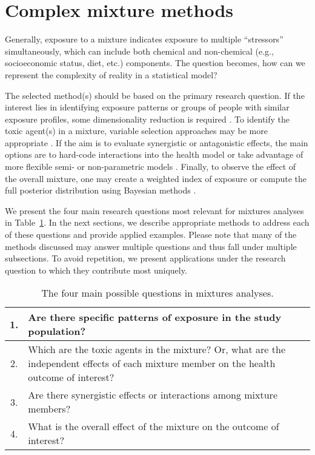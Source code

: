 \section{Complex mixture methods}\label{sec:Methods}

Generally, exposure to a mixture indicates exposure to multiple ``stressors'' simultaneously, which can include both chemical and non-chemical (e.g., socioeconomic status, diet, etc.) components. The question becomes, how can we represent the complexity of reality in a statistical model? 

The selected method(s) should be based on the primary research question. If the interest lies in identifying exposure patterns or groups of people with similar exposure profiles, some dimensionality reduction is required \citep{jolliffe02, thompson04, paatero94}. To identify the toxic agent(s) in a mixture, variable selection approaches may be more appropriate \citep{tibshirani96, zou05}. If the aim is to evaluate synergistic or antagonistic effects, the main options are to hard-code interactions into the health model or take advantage of more flexible semi- or non-parametric models \citep{bobb2014bayesian,coull2015,bobb2018statistical}. Finally, to observe the effect of the overall mixture, one may create a weighted index of exposure or compute the full posterior distribution using Bayesian methods \citep{carrico15,bobb2014bayesian,coull2015}.

We present the four main research questions most relevant for mixtures analyses in Table~\ref{tab:qx}. In the next sections, we describe appropriate methods to address each of these questions and provide applied examples. Please note that many of the methods discussed may answer multiple questions and thus fall under multiple subsections. To avoid repetition, we present applications under the research question to which they contribute most uniquely. \\

\begingroup
\renewcommand{\arraystretch}{1.4}
\begin{table}[ht]
\begin{center}
\caption[The four main questions in mixtures analyses]{The four main possible questions in mixtures analyses.}
\label{tab:qx}
\begin{tabular}{c p{15cm}}
\hline
\hline
  1. & Are there specific patterns of exposure in the study population? \\
  \hline
  2. & Which are the toxic agents in the mixture? Or, what are the independent effects of each mixture member on the health outcome of interest? \\
  \hline
  3. & Are there synergistic effects or interactions among mixture members? \\
  \hline
  4. & What is the overall effect of the mixture on the outcome of interest? \\
\hline
\hline
\end{tabular}
\end{center}
\end{table}
\endgroup
\vspace{-2em}

